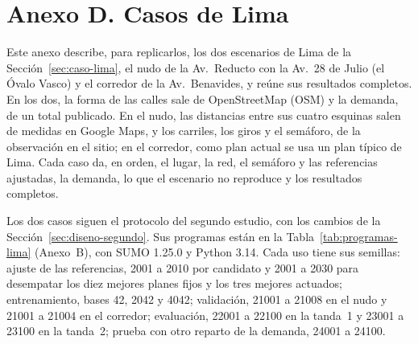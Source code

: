 \section*{Anexo D. Casos de Lima}
{}
\setcounter{figure}{0}
\renewcommand{\thefigure}{D.\arabic{figure}}
\renewcommand{\theHfigure}{D.\arabic{figure}}
\setcounter{table}{0}
\renewcommand{\thetable}{D.\arabic{table}}
\renewcommand{\theHtable}{D.\arabic{table}}

Este anexo describe, para replicarlos, los dos escenarios de Lima de la
Sección~\ref{sec:caso-lima}, el nudo de la Av.~Reducto con la Av.~28 de
Julio (el Óvalo Vasco) y el corredor de la Av.~Benavides, y reúne sus
resultados completos. En los dos, la forma de las calles sale
de OpenStreetMap (OSM) y la demanda, de un total publicado. En el nudo,
las distancias entre sus cuatro esquinas salen de medidas en Google
Maps, y los carriles, los giros y el semáforo, de la observación en el
sitio; en el corredor, como plan actual se usa un plan típico de Lima.
Cada caso da, en
orden, el lugar, la red, el semáforo y las referencias ajustadas, la
demanda, lo que el escenario no reproduce y los resultados completos.

Los dos casos siguen el protocolo del segundo estudio, con los cambios
de la Sección~\ref{sec:diseno-segundo}. Sus programas están en la
Tabla~\ref{tab:programas-lima} (Anexo~B), con SUMO 1.25.0 y
Python 3.14. Cada uso tiene sus semillas: ajuste de las referencias,
2001 a 2010 por candidato y 2001 a 2030 para desempatar los diez
mejores planes fijos y los tres mejores actuados; entrenamiento, bases 42, 2042 y 4042; validación, 21001 a
21008 en el nudo y 21001 a 21004 en el corredor; evaluación, 22001 a
22100 en la tanda~1 y 23001 a 23100 en la tanda~2; prueba con otro
reparto de la demanda, 24001 a 24100.

